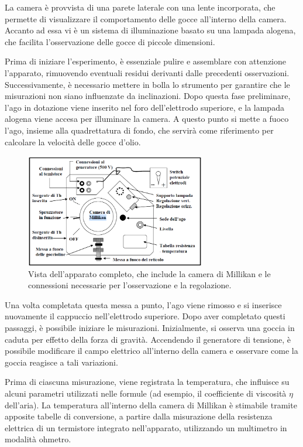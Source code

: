 \documentclass[a4paper,12pt]{article}
\begin{document}
La camera è provvista di una parete laterale con una lente incorporata, che permette di visualizzare il comportamento delle gocce all'interno della camera. Accanto ad essa vi è un sistema di illuminazione basato su una lampada alogena, che facilita l’osservazione delle gocce di piccole dimensioni.

Prima di iniziare l’esperimento, è essenziale pulire e assemblare con attenzione l’apparato, rimuovendo eventuali residui derivanti dalle precedenti osservazioni. Successivamente, è necessario mettere in bolla lo strumento per garantire che le misurazioni non siano influenzate da inclinazioni. Dopo questa fase preliminare, l’ago in dotazione viene inserito nel foro dell'elettrodo superiore, e la lampada alogena viene accesa per illuminare la camera. A questo punto si mette a fuoco l’ago, insieme alla quadrettatura di fondo, che servirà come riferimento per calcolare la velocità delle gocce d'olio.

\begin{figure}[H]
    \centering
    \includegraphics[width=0.7\textwidth]{Apparatopng.png}
    \caption{Vista dell'apparato completo, che include la camera di Millikan e le connessioni necessarie per l'osservazione e la regolazione.}
    \label{fig:apparato_completo}
\end{figure}

Una volta completata questa messa a punto, l’ago viene rimosso e si inserisce nuovamente il cappuccio nell’elettrodo superiore. Dopo aver completato questi passaggi, è possibile iniziare le misurazioni. Inizialmente, si osserva una goccia in caduta per effetto della forza di gravità. Accendendo il generatore di tensione, è possibile modificare il campo elettrico all'interno della camera e osservare come la goccia reagisce a tali variazioni.

Prima di ciascuna misurazione, viene registrata la temperatura, che influisce su alcuni parametri utilizzati nelle formule (ad esempio, il coefficiente di viscosità \(\eta\) dell'aria). La temperatura all'interno della camera di Millikan è stimabile tramite apposite tabelle di conversione, a partire dalla misurazione della resistenza elettrica di un termistore integrato nell’apparato, utilizzando un multimetro in modalità ohmetro.
\end{document}
